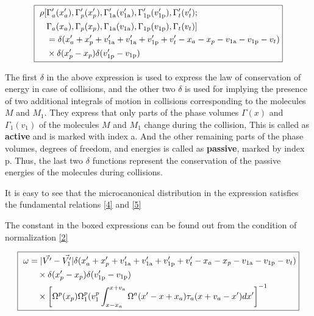 \documentclass{article}
\begin{document}
\begin{equation}
\fbox{
$\displaystyle
\begin{aligned}
\rho[&\Gamma'_a(x'_a),\Gamma'_p(x'_p),\Gamma'_\text{1a}(v'_\text{1a}),\Gamma'_\text{1p}(v'_\text{1p}),\Gamma'_t(v'_t); \\
&\Gamma_a(x_a), \Gamma_p(x_p), \Gamma_\text{1a}(v_\text{1a}),\Gamma_\text{1p}(v_\text{1p}),\Gamma_t(v_t)] \\
&= \delta(x'_a+x'_p+ v'_\text{1a}+v'_\text{1a}+v'_\text{1p}+v'_t-x_a-x_p-v_\text{1a}-v_\text{1p}-v_t) \\
&\times\delta(x'_p-x_p)\delta  (v'_\text{1p}-v_\text{1p})
\end{aligned}
$}
\end{equation}
\label{eq:3}



The first $\delta$ in the above expression is used to express the law of conservation of energy in case of collisions, and the other  two $\delta$ is used for implying the presence of two additional integrals of motion in collisions
corresponding to the molecules $M$ and $ M_1$. They express that only parts of the
phase volumes $\Gamma(x)$ and $\Gamma_1(v_1)$ of the molecules $M$ and $M_1$ change during the collision, This is called as \textbf{active} and is marked with index a. And the other remaining parts of
the phase volumes, degrees of freedom, and energies is called as \textbf{passive}, marked by index p. Thus,
the last two $\delta$ functions represent the conservation of the passive energies
of the molecules during collisions.

It is easy to see that the microcanonical distribution in the expression satisfies the fundamental
relations \eqref{4} and \eqref{5}

The constant in the boxed expressions can be found out from the condition of normalization \eqref{2}

\begin{equation}
\fbox{
$\displaystyle
\begin{aligned}
\omega &= |\Vec{V'}-\Vec{V'_1}|\delta(x'_a+x'_p+v'_\text{1a}+v'_\text{1a}+v'_\text{1p}+v'_t-x_a-x_p-v_\text{1a}-v_\text{1p}-v_t) \\
&\quad \times \delta(x'_p-x_p)\delta(v'_\text{1p}-v_\text{1p}) \\
&\quad \times \left[\Omega^p(x_p)\Omega^p_1(v_1^p \int_{x-x_a}^{x+v_a} \Omega^a(x'-x+x_a)\tau_a(x+v_a-x')dx'\right]^{-1}
\end{aligned}
$}
\end{equation}
\label{eq:6}
\end{document}
